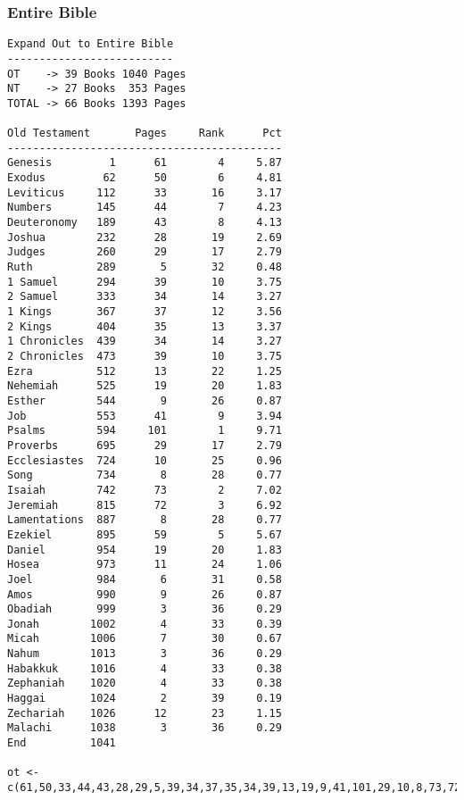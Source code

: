 \documentclass{article}
\begin{document}
\subsubsection{Entire Bible}
\begin{verbatim}
Expand Out to Entire Bible
--------------------------
OT    -> 39 Books 1040 Pages
NT    -> 27 Books  353 Pages
TOTAL -> 66 Books 1393 Pages

Old Testament       Pages     Rank      Pct
-------------------------------------------
Genesis         1      61        4     5.87
Exodus         62      50        6     4.81 
Leviticus     112      33       16     3.17
Numbers       145      44        7     4.23
Deuteronomy   189      43        8     4.13
Joshua        232      28       19     2.69
Judges        260      29       17     2.79
Ruth          289       5       32     0.48
1 Samuel      294      39       10     3.75
2 Samuel      333      34       14     3.27
1 Kings       367      37       12     3.56 
2 Kings       404      35       13     3.37
1 Chronicles  439      34       14     3.27
2 Chronicles  473      39       10     3.75
Ezra          512      13       22     1.25
Nehemiah      525      19       20     1.83
Esther        544       9       26     0.87
Job           553      41        9     3.94
Psalms        594     101        1     9.71
Proverbs      695      29       17     2.79
Ecclesiastes  724      10       25     0.96
Song          734       8       28     0.77
Isaiah        742      73        2     7.02
Jeremiah      815      72        3     6.92
Lamentations  887       8       28     0.77
Ezekiel       895      59        5     5.67
Daniel        954      19       20     1.83
Hosea         973      11       24     1.06 
Joel          984       6       31     0.58
Amos          990       9       26     0.87
Obadiah       999       3       36     0.29
Jonah        1002       4       33     0.39
Micah        1006       7       30     0.67
Nahum        1013       3       36     0.29
Habakkuk     1016       4       33     0.38
Zephaniah    1020       4       33     0.38 
Haggai       1024       2       39     0.19
Zechariah    1026      12       23     1.15 
Malachi      1038       3       36     0.29 
End          1041      

ot <- c(61,50,33,44,43,28,29,5,39,34,37,35,34,39,13,19,9,41,101,29,10,8,73,72,8,59,19,11,6,9,3,4,7,3,4,4,2,12,3)      



\end{verbatim}
\end{document}
